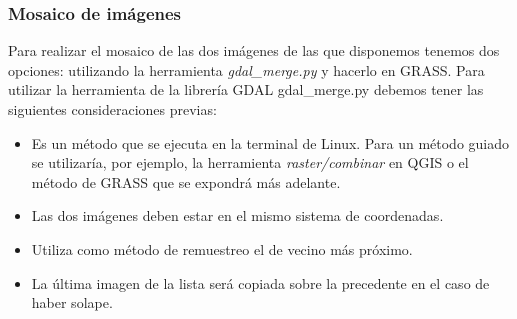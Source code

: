 


\subsubsection{Mosaico de imágenes}
Para realizar el mosaico de las dos imágenes de las que disponemos tenemos dos opciones: utilizando la herramienta \textit{gdal\_merge.py} y hacerlo en GRASS. Para utilizar la herramienta de la librería \ac{GDAL} gdal\_merge.py debemos tener las siguientes consideraciones previas:

\begin{itemize}
	\item Es un método que se ejecuta en la terminal de Linux. Para un método guiado se utilizaría, por ejemplo, la herramienta \textit{raster/combinar} en QGIS o el método de GRASS que se expondrá más adelante.
	\item Las dos imágenes deben estar en el mismo sistema de coordenadas.
	\item Utiliza como método de remuestreo el de vecino más próximo.
	\item La última imagen de la lista será copiada sobre la precedente en el caso de haber solape.
\end{itemize}

